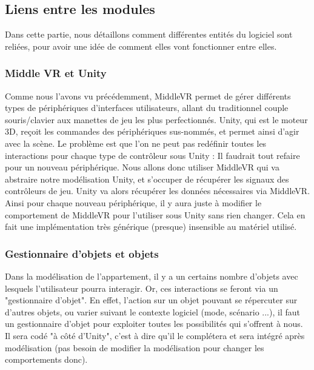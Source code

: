 %
%
\subsection{Liens entre les modules}
Dans cette partie, nous détaillons comment différentes entités du logiciel sont reliées, pour avoir une idée de comment elles vont fonctionner entre elles.

\subsubsection{Middle VR et Unity}
Comme nous l'avons vu précédemment, MiddleVR permet de gérer différents types de périphériques d'interfaces utilisateurs, allant du traditionnel couple souris/clavier aux manettes de jeu les plus perfectionnés. Unity, qui est le moteur 3D, reçoit les commandes des périphériques sus-nommés, et permet ainsi d'agir avec la scène. Le problème est que l'on ne peut pas redéfinir toutes les interactions pour chaque type de contrôleur sous Unity : Il faudrait tout refaire pour un nouveau périphérique. 
Nous allons donc utiliser MiddleVR qui va abstraire notre modélisation Unity, et s'occuper de récupérer les signaux des contrôleurs de jeu. Unity va alors récupérer les données nécessaires via MiddleVR. Ainsi pour chaque nouveau périphérique, il y aura juste à modifier le comportement de MiddleVR pour l'utiliser sous Unity sans rien changer. Cela en fait une implémentation très générique (presque) insensible au matériel utilisé.


\subsubsection{Gestionnaire d'objets et objets}

Dans la modélisation de l'appartement, il y a un certains nombre d'objets avec lesquels l'utilisateur pourra interagir. Or, ces interactions se feront via un "gestionnaire d'objet". En effet, l'action sur un objet pouvant se répercuter sur d'autres objets, ou varier suivant le contexte logiciel (mode, scénario ...), il faut un gestionnaire d'objet pour exploiter toutes les possibilités qui s'offrent à nous. Il sera codé "à côté d'Unity", c'est à dire qu'il le complétera et sera intégré après modélisation (pas besoin de modifier la modélisation pour changer les comportements donc).


